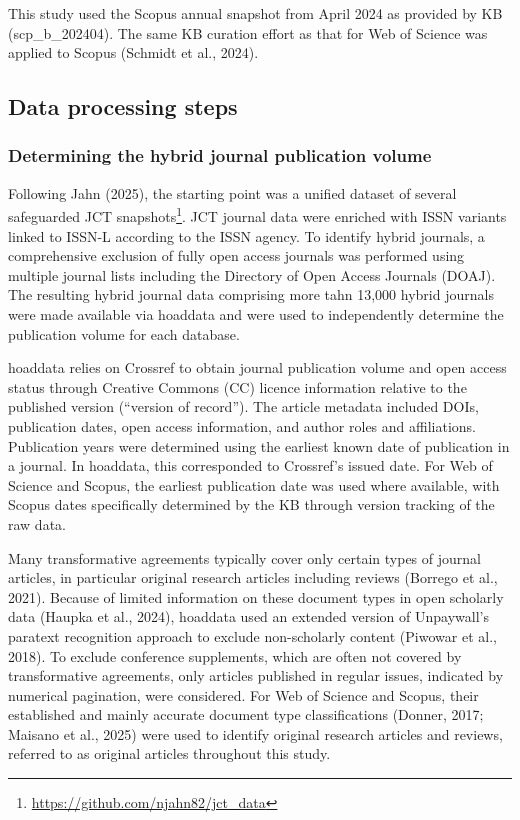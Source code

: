 \documentclass[a4paper,man,floatsintext,longtable,noextraspace,10pt]{apa6}
\begin{document}
This study used the Scopus annual snapshot from April 2024 as provided
by KB (scp\_b\_202404). The same KB curation effort as that for Web of
Science was applied to Scopus (Schmidt et al., 2024).

\subsection{Data processing steps}\label{data-processing-steps}

\subsubsection{Determining the hybrid journal publication
volume}\label{determining-the-hybrid-journal-publication-volume}

Following Jahn (2025), the starting point was a unified dataset of
several safeguarded JCT snapshots\footnote{\url{https://github.com/njahn82/jct_data}}.
JCT journal data were enriched with ISSN variants linked to ISSN-L
according to the ISSN agency. To identify hybrid journals, a
comprehensive exclusion of fully open access journals was performed
using multiple journal lists including the Directory of Open Access
Journals (DOAJ). The resulting hybrid journal data comprising more tahn
13,000 hybrid journals were made available via hoaddata and were used to
independently determine the publication volume for each database.

hoaddata relies on Crossref to obtain journal publication volume and
open access status through Creative Commons (CC) licence information
relative to the published version (``version of record''). The article
metadata included DOIs, publication dates, open access information, and
author roles and affiliations. Publication years were determined using
the earliest known date of publication in a journal. In hoaddata, this
corresponded to Crossref's issued date. For Web of Science and Scopus,
the earliest publication date was used where available, with Scopus
dates specifically determined by the KB through version tracking of the
raw data.

Many transformative agreements typically cover only certain types of
journal articles, in particular original research articles including
reviews (Borrego et al., 2021). Because of limited information on these
document types in open scholarly data (Haupka et al., 2024), hoaddata
used an extended version of Unpaywall's paratext recognition approach to
exclude non-scholarly content (Piwowar et al., 2018). To exclude
conference supplements, which are often not covered by transformative
agreements, only articles published in regular issues, indicated by
numerical pagination, were considered. For Web of Science and Scopus,
their established and mainly accurate document type classifications
(Donner, 2017; Maisano et al., 2025) were used to identify original
research articles and reviews, referred to as original articles
throughout this study.
\end{document}

